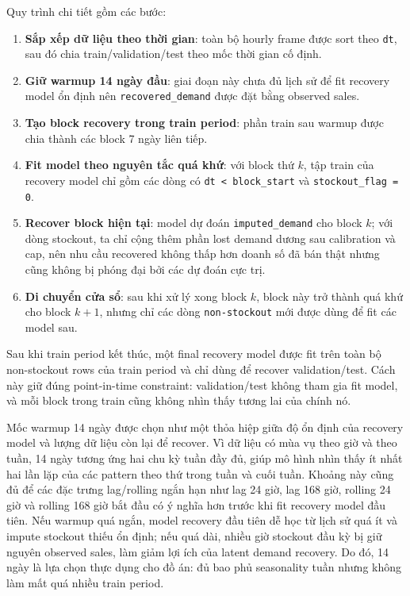 \documentclass[12pt,a4paper]{article}
\begin{document}
Quy trình chi tiết gồm các bước:
\begin{enumerate}
    \item \textbf{Sắp xếp dữ liệu theo thời gian}: toàn bộ hourly frame được sort theo \texttt{dt}, sau đó chia train/validation/test theo mốc thời gian cố định.
    \item \textbf{Giữ warmup 14 ngày đầu}: giai đoạn này chưa đủ lịch sử để fit recovery model ổn định nên \texttt{recovered\_demand} được đặt bằng observed sales.
    \item \textbf{Tạo block recovery trong train period}: phần train sau warmup được chia thành các block 7 ngày liên tiếp.
    \item \textbf{Fit model theo nguyên tắc quá khứ}: với block thứ $k$, tập train của recovery model chỉ gồm các dòng có \texttt{dt < block\_start} và \texttt{stockout\_flag = 0}.
    \item \textbf{Recover block hiện tại}: model dự đoán \texttt{imputed\_demand} cho block $k$; với dòng stockout, ta chỉ cộng thêm phần lost demand dương sau calibration và cap, nên nhu cầu recovered không thấp hơn doanh số đã bán thật nhưng cũng không bị phóng đại bởi các dự đoán cực trị.
    \item \textbf{Di chuyển cửa sổ}: sau khi xử lý xong block $k$, block này trở thành quá khứ cho block $k+1$, nhưng chỉ các dòng \texttt{non-stockout} mới được dùng để fit các model sau.
\end{enumerate}
Sau khi train period kết thúc, một final recovery model được fit trên toàn bộ non-stockout rows của train period và chỉ dùng để recover validation/test.
Cách này giữ đúng point-in-time constraint: validation/test không tham gia fit model, và mỗi block trong train cũng không nhìn thấy tương lai của chính nó.

Mốc warmup 14 ngày được chọn như một thỏa hiệp giữa độ ổn định của recovery model và lượng dữ liệu còn lại để recover.
Vì dữ liệu có mùa vụ theo giờ và theo tuần, 14 ngày tương ứng hai chu kỳ tuần đầy đủ, giúp mô hình nhìn thấy ít nhất hai lần lặp của các pattern theo thứ trong tuần và cuối tuần.
Khoảng này cũng đủ để các đặc trưng lag/rolling ngắn hạn như lag 24 giờ, lag 168 giờ, rolling 24 giờ và rolling 168 giờ bắt đầu có ý nghĩa hơn trước khi fit recovery model đầu tiên.
Nếu warmup quá ngắn, model recovery đầu tiên dễ học từ lịch sử quá ít và impute stockout thiếu ổn định; nếu quá dài, nhiều giờ stockout đầu kỳ bị giữ nguyên observed sales, làm giảm lợi ích của latent demand recovery.
Do đó, 14 ngày là lựa chọn thực dụng cho đồ án: đủ bao phủ seasonality tuần nhưng không làm mất quá nhiều train period.
\end{document}
